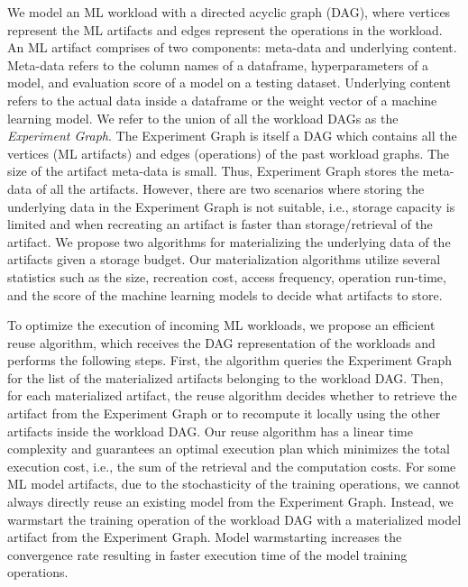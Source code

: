 We model an ML workload with a directed acyclic graph (DAG), where vertices represent the ML artifacts and edges represent the operations in the workload.
An ML artifact comprises of two components: meta-data and underlying content.
Meta-data refers to the column names of a dataframe, hyperparameters of a model, and evaluation score of a model on a testing dataset.
Underlying content refers to the actual data inside a dataframe or the weight vector of a machine learning model.
We refer to the union of all the workload DAGs as the \textit{Experiment Graph}.
The Experiment Graph is itself a DAG which contains all the vertices (ML artifacts) and edges (operations) of the past workload graphs.
The size of the artifact meta-data is small.
Thus, Experiment Graph stores the meta-data of all the artifacts.
However, there are two scenarios where storing the underlying data in the Experiment Graph is not suitable, i.e., storage capacity is limited and when recreating an artifact is faster than storage/retrieval of the artifact.
We propose two algorithms for materializing the underlying data of the artifacts given a storage budget.
Our materialization algorithms utilize several statistics such as the size, recreation cost, access frequency, operation run-time, and the score of the machine learning models to decide what artifacts to store.

To optimize the execution of incoming ML workloads, we propose an efficient reuse algorithm, which receives the DAG representation of the workloads and performs the following steps.
First, the algorithm queries the Experiment Graph for the list of the materialized artifacts belonging to the workload DAG.
Then, for each materialized artifact, the reuse algorithm decides whether to retrieve the artifact from the Experiment Graph or to recompute it locally using the other artifacts inside the workload DAG.
Our reuse algorithm has a linear time complexity and guarantees an optimal execution plan which minimizes the total execution cost, i.e., the sum of the retrieval and the computation costs.
For some ML model artifacts, due to the stochasticity of the training operations, we cannot always directly reuse an existing model from the Experiment Graph.
Instead, we warmstart the training operation of the workload DAG with a materialized model artifact from the Experiment Graph.
Model warmstarting increases the convergence rate resulting in faster execution time of the model training operations.

